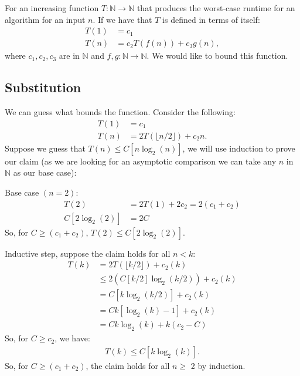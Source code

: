 \documentclass[a4paper, 12pt, twoside]{article}
\begin{document}
For an increasing function $T: \mathbb{N} \to \mathbb{N}$ that
produces the worst-case runtime for an algorithm for an input
$n$. If we have that $T$ is defined in terms of itself:
\begin{align*}
      T(1) &= c_1 \\
      T(n) &= c_2T(f(n)) + c_3g(n),
\end{align*}
where $c_1, c_2, c_3$ are in $\mathbb{N}$ and 
$f, g: \mathbb{N} \to \mathbb{N}$. We would like to bound
this function.

\subsection{Substitution}

We can guess what bounds the function. Consider the following:
\begin{align*}
      T(1) &= c_1 \\
      T(n) &= 2T(\lfloor n / 2 \rfloor) + c_2n.
\end{align*}
Suppose we guess that $T(n) \leq C[n\log_2(n)]$, we will use induction
to prove our claim (as we are looking for an asymptotic comparison
we can take any $n$ in $\mathbb{N}$ as our base case):
\begin{center}
      Base case $(n = 2)$:
      \begin{align*}
            T(2) & = 2T(1) + 2c_2 = 2(c_1 + c_2) \\
            C[2\log_2(2)] & = 2C
      \end{align*} 
      So, for $C \geq (c_1 + c_2)$, $T(2) \leq C[2\log_2(2)]$.    
\end{center}
\begin{center}
      Inductive step, suppose the claim holds for all $n < k$:
      \begin{align*}
            T(k) & = 2T(\lfloor k / 2 \rfloor) + c_2(k) \\
            & \leq 2(C[k / 2]\log_2(k / 2)) + c_2(k) \\
            & = C[k\log_2(k / 2)] + c_2(k) \\
            & = Ck[\log_2(k) - 1] + c_2(k) \\
            & = Ck\log_2(k) + k(c_2 - C)
      \end{align*}
      So, for $C \geq c_2$, we have:
      \begin{align*}
            T(k) \leq C[k\log_2(k)].
      \end{align*}
      So, for $C \geq (c_1 + c_2)$, the claim holds for all $n \geq$ 2
      by induction.
\end{center}
\end{document}
